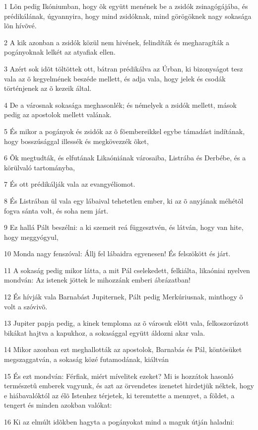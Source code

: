 \par 1 Lõn pedig Ikóniumban, hogy õk együtt menének be a zsidók zsinagógájába, és prédikálának, úgyannyira, hogy mind zsidóknak, mind görögöknek nagy sokasága lõn hívõvé.
\par 2 A kik azonban a zsidók közül nem hivének, felindíták és megharagíták a pogányoknak lelkét az atyafiak ellen.
\par 3 Azért sok idõt töltöttek ott, bátran prédikálva az Úrban, ki bizonyságot tesz vala az õ kegyelmének beszéde mellett, és adja vala, hogy jelek és csodák történjenek az õ kezeik által.
\par 4 De a városnak sokasága meghasonlék; és némelyek a zsidók mellett, mások pedig az apostolok mellett valának.
\par 5 És mikor a pogányok és zsidók az õ fõembereikkel egybe támadást indítának, hogy bosszúsággal illessék és megkövezzék õket,
\par 6 Õk megtudták, és elfutának Likaóniának városaiba, Listrába és Derbébe, és a körülvaló tartományba,
\par 7 És ott prédikálják vala az evangyéliomot.
\par 8 És Listrában ül vala egy lábaival tehetetlen ember, ki az õ anyjának méhétõl fogva sánta volt, és soha nem járt.
\par 9 Ez hallá Pált beszélni: a ki szemeit reá függesztvén, és látván, hogy van hite, hogy meggyógyul,
\par 10 Monda nagy fenszóval: Állj fel lábaidra egyenesen! És felszökött és járt.
\par 11 A sokaság pedig mikor látta, a mit Pál cselekedett, felkiálta, likaóniai nyelven mondván: Az istenek jöttek le mihozzánk emberi ábrázatban!
\par 12 És hívják vala Barnabást Jupiternek, Pált pedig Merkúriusnak, minthogy õ volt a szóvivõ.
\par 13 Jupiter papja pedig, a kinek temploma az õ városuk elõtt vala, felkoszorúzott bikákat hajtva a kapukhoz, a sokasággal együtt áldozni akar vala.
\par 14 Mikor azonban ezt meghallották az apostolok, Barnabás és Pál, köntösüket megszaggatván, a sokaság közé futamodának, kiáltván
\par 15 És ezt mondván: Férfiak, miért mívelitek ezeket? Mi is hozzátok hasonló természetû emberek vagyunk, és azt az örvendetes izenetet hirdetjük néktek, hogy e hiábavalóktól az élõ Istenhez  térjetek, ki teremtette a mennyet, a földet, a tengert és minden azokban valókat:
\par 16 Ki az elmúlt idõkben hagyta a pogányokat mind a maguk útján haladni:
